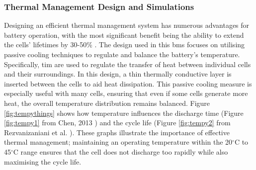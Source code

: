 \subsubsection{Thermal Management Design and Simulations}

Designing an efficient thermal management system has numerous advantages for battery operation, with the most significant benefit being the ability to extend the cells' lifetimes by 30-50\% \cite{TOGUN20251077}. The design used in this \gls{bms} focuses on utilising passive cooling techniques to regulate and balance the battery's temperature. Specifically, \gls{tim} are used to regulate the transfer of heat between individual cells and their surroundings. In this design, a thin thermally conductive layer is inserted between the cells to aid heat dissipation. This passive cooling measure is especially useful with many cells, ensuring that even if some cells generate more heat, the overall temperature distribution remains balanced. Figure \ref{fig:tempythings} shows how temperature influences the discharge time (Figure \ref{fig:tempy1} from Chen, 2013 \cite{chen2013heat}) and the cycle life (Figure \ref{fig:tempy2} from Rezvanizaniani et al. \cite{REZVANIZANIANI2014110}). These graphs illustrate the importance of effective thermal management; maintaining an operating temperature within the 20$^\circ\text{C}$ to 45$^\circ\text{C}$ range ensures that the cell does not discharge too rapidly while also maximising the cycle life.

